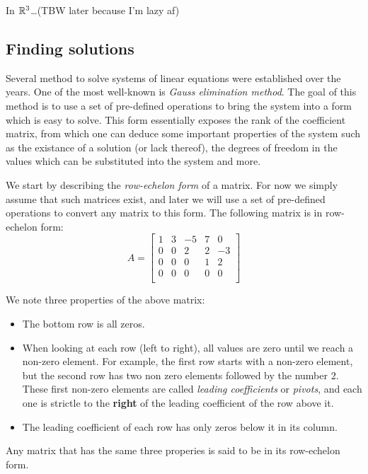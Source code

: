 In $\mathbb{R}^{3}$\ldots (TBW later because I'm lazy af)

\subsection{Finding solutions}
Several method to solve systems of linear equations were established over the years. One of the most well-known is \emph{Gauss elimination method}. The goal of this method is to use a set of pre-defined operations to bring the system into a form which is easy to solve. This form essentially exposes the rank of the coefficient matrix, from which one can deduce some important properties of the system such as the existance of a solution (or lack thereof), the degrees of freedom in the values which can be substituted into the system and more.

We start by describing the \emph{row-echelon form} of a matrix. For now we simply assume that such matrices exist, and later we will use a set of pre-defined operations to convert any matrix to this form. The following matrix is in row-echelon form:
\[
	A =
	\begin{bmatrix}
		1 & 3 & -5 & 7 &  0\\
		0 & 0 &  2 & 2 & -3\\
		0 & 0 &  0 & 1 &  2\\
		0 & 0 &  0 & 0 &  0\\
	\end{bmatrix} 
\]

We note three properties of the above matrix:
\begin{itemize}
	\item The bottom row is all zeros.
	\item When looking at each row (left to right), all values are zero until we reach a non-zero element. For example, the first row starts with a non-zero element, but the second row has two non zero elements followed by the number $2$. These first non-zero elements are called \emph{leading coefficients} or \emph{pivots}, and each one is strictle to the \textbf{right} of the leading coefficient of the row above it.
	\item The leading coefficient of each row has only zeros below it in its column.
\end{itemize}
Any matrix that has the same three properies is said to be in its row-echelon form.

